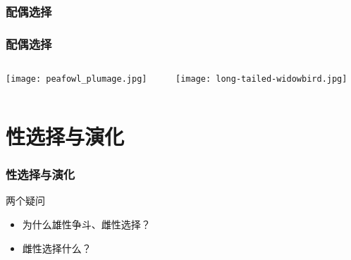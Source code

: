 \documentclass[UTF8,lualatex]{ctexbeamer}
\begin{document}
\subsubsection{配偶选择}

\begin{frame}
    \frametitle{配偶选择}
    \begin{columns}
        \begin{column}{.48\textwidth}
            \texttt{[image: peafowl\_plumage.jpg]}
        \end{column}
        \begin{column}{.48\textwidth}
            \texttt{[image: long-tailed-widowbird.jpg]}
        \end{column}
    \end{columns}
\end{frame}


\section{性选择与演化}

\begin{frame}
    \frametitle{性选择与演化}
    \begin{block}{两个疑问}
        \begin{itemize}
            \item 为什么雄性争斗、雌性选择？
            \item 雌性选择什么？
        \end{itemize}
    \end{block}
\end{frame}
\end{document}
